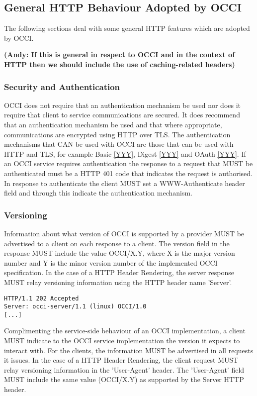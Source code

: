 \documentclass[10pt,a4paper]{article}
\begin{document}
\subsection{General HTTP Behaviour Adopted by OCCI}
The following sections deal with some general HTTP features which are
adopted by OCCI.

\textbf{(Andy: If this is general in respect to OCCI and in the context of HTTP then
we should include the use of caching-related headers)}

\subsubsection{Security and Authentication}
OCCI does not require that an authentication mechanism be used nor
does it require that client to service communications are secured. It
does recommend that an authentication mechanism be used and that where
appropriate, communications are encrypted using HTTP over TLS. The
authentication mechanisms that CAN be used with OCCI are those that
can be used with HTTP and TLS, for example Basic \ref{YYY}, Digest \ref{YYY}
and OAuth \ref{YYY}. If an OCCI service requires authentication the
response to a request that MUST be authenticated must be a HTTP 401
code that indicates the request is authorised. In response to
authenticate the client MUST set a WWW-Authenticate header field and
through this indicate the authentication mechanism.

\subsubsection{Versioning}
Information about what version of OCCI is supported by a provider MUST
be advertised to a client on each response to a client. The version
field in the response MUST include the value OCCI/X.Y, where X is the
major version number and Y is the minor version number of the
implemented OCCI specification. In the case of a HTTP Header
Rendering, the server response MUST relay versioning information
using the HTTP header name 'Server'.

\begin{verbatim}
HTTP/1.1 202 Accepted
Server: occi-server/1.1 (linux) OCCI/1.0
[...]
\end{verbatim}

Complimenting the service-side behaviour of an OCCI implementation, a
client MUST indicate to the OCCI service implementation the version it
expects to interact with. For the clients, the information MUST be
advertised in all requests it issues. In the case of a HTTP Header
Rendering, the client request MUST relay versioning information in
the 'User-Agent' header. The 'User-Agent' field MUST include the same
value (OCCI/X.Y) as supported by the Server HTTP header.
\end{document}
